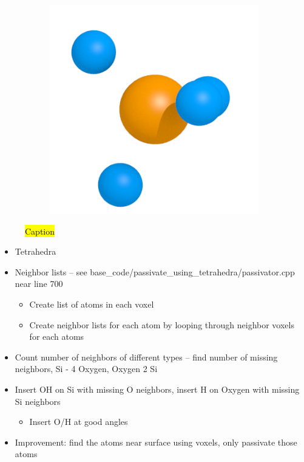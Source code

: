 \begin{figure}[htpb]
\begin{subfigure}[b]{0.24\textwidth}
        \caption{}%
    \end{subfigure}%
    \begin{subfigure}[b]{0.24\textwidth}%
        \includegraphics[width=\textwidth]{images/passivation/tetrahedra04.png}%
        \caption{}%
    \end{subfigure}%
    \caption{\hl{Caption}}%
    \label{fig:passivation}%
\end{figure}%

\begin{itemize}
    \item Tetrahedra
    \item Neighbor lists -- see base\_code/passivate\_using\_tetrahedra/passivator.cpp near line 700
    \begin{itemize}
        \item Create list of atoms in each voxel
        \item Create neighbor lists for each atom by looping through neighbor voxels for each atoms
    \end{itemize}
    \item Count number of neighbors of different types -- find number of missing neighbors, Si - 4 Oxygen, Oxygen 2 Si
    \item Insert OH on Si with missing O neighbors, insert H on Oxygen with missing Si neighbors
    \begin{itemize}
        \item Insert O/H at good angles
    \end{itemize}
    \item Improvement: find the atoms near surface using voxels, only passivate those atoms
\end{itemize}

